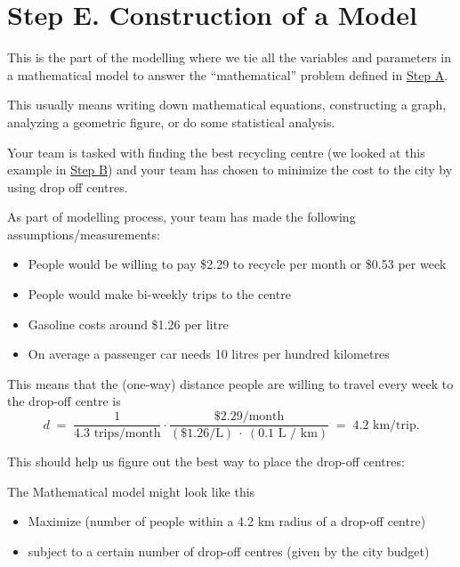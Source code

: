 \section*{Step E. Construction of a Model}\label{E-model}


This is the part of the modelling where we tie all the variables and parameters in a mathematical model to answer the ``mathematical'' problem defined in \hyperref[A-define]{Step A}.

This usually means writing down mathematical equations, constructing a graph, analyzing a geometric figure, or do some statistical analysis.


\begin{example}
Your team is tasked with finding the best recycling centre (we looked at this example in \hyperref[B-mindmap]{Step B}) and your  team has chosen to minimize the cost to the city by using drop off centres.

As part of modelling process, your team has made the following assumptions/measurements:
\begin{itemize}
	\item People would be willing to pay \$2.29 to recycle per month or \$0.53 per week
	\item People would make bi-weekly trips to the centre
	\item Gasoline costs around \$1.26 per litre
	\item On average a passenger car needs 10 litres per hundred kilometres
\end{itemize}

This means that the (one-way) distance people are willing to travel every week to the drop-off centre is
$$
d \;=\; \frac{1}{4.3 \text{ trips/month}} \cdot \frac{\$2.29 / {\text{month}} }{(\$1.26 \text{/L}) \ \cdot\  (0.1 \text{ L / km})} \;=\; 4.2 \text{  km/trip}.
$$

This should help us figure out the best way to place the drop-off centres:

The Mathematical model might look like this

\begin{itemize}
	\item Maximize (number of people within a 4.2 km radius of a drop-off centre)
	\item subject to a certain number of drop-off centres (given by the city budget)
\end{itemize}

	
\end{example}



